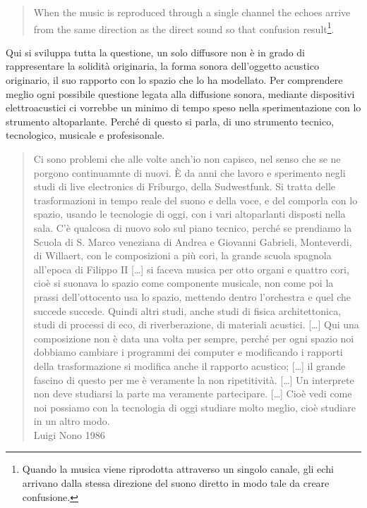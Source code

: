 \begin{quote}
When the music is reproduced through a single channel the echoes arrive from the same direction as the direct sound so that confusion result\footnote{Quando la musica viene riprodotta attraverso un singolo canale, gli echi arrivano dalla stessa direzione del suono diretto in modo tale da creare confusione.}.
\end{quote}

Qui si sviluppa tutta la questione, un solo diffusore non è in grado di rappresentare
la solidità originaria, la forma sonora dell'oggetto acustico originario, il suo
rapporto con lo spazio che lo ha modellato. Per comprendere meglio ogni possibile
questione legata alla diffusione sonora, mediante dispositivi elettroacustici ci
vorrebbe un minimo di tempo speso nella sperimentazione con lo strumento altoparlante.
Perché di questo si parla, di uno strumento tecnico, tecnologico, musicale e
profesisonale.

\begin{quote}
Ci sono problemi che alle volte anch'io non capisco, nel senso che se ne porgono
continuamnte di nuovi. È da anni che lavoro e sperimento negli studi di live electronics di
Friburgo, della Sudwestfunk. Si tratta delle trasformazioni in tempo reale del
suono e della voce, e del comporla con lo spazio, usando le tecnologie di oggi,
con i vari altoparlanti disposti nella sala. C'è qualcosa di nuovo solo sul piano
tecnico, perché  se prendiamo la Scuola di S. Marco veneziana di Andrea e Giovanni
Gabrieli, Monteverdi, di Willaert, con le composizioni a più cori, la grande
scuola spagnola all'epoca di Filippo II [\ldots] si faceva musica per otto organi
e quattro cori, cioè si suonava lo spazio come componente musicale, non come poi
la prassi dell'ottocento usa lo spazio, mettendo dentro l'orchestra e quel che
succede succede. Quindi altri studi, anche studi di fisica architettonica, studi
di processi di eco, di riverberazione, di materiali acustici. [\ldots] Qui una
composizione non è  data una volta per sempre, perché per ogni spazio noi dobbiamo
cambiare i programmi dei computer e modificando i rapporti della trasformazione si modifica anche il rapporto acustico; [\ldots] il grande fascino di questo per me
è veramente la non ripetitività. [\ldots] Un interprete non deve studiarsi la
parte ma veramente partecipare. [\ldots] Cioè vedi come noi possiamo con la
tecnologia di oggi studiare molto meglio, cioè studiare in un altro modo. \\
Luigi Nono 1986
\end{quote}

